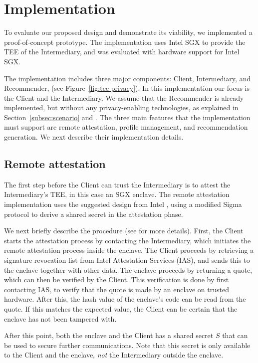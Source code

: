 {\section{Implementation}
\label{sec:recsyssgx:implementation}

To evaluate our proposed design and demonstrate its viability, we implemented a proof-of-concept prototype.
The implementation uses Intel SGX to provide the TEE of the Intermediary, and was evaluated with hardware support for Intel SGX.

The implementation includes three major components: Client, Intermediary, and Recommender, (see Figure~\ref{fig:tee-privacy}).
In this implementation our focus is the Client and the Intermediary.
We assume that the Recommender is already implemented, but without any privacy-enabling technologies, as explained in Section~\ref{subsec:scenario} and \cite{cobleigh:2018}.
The three main features that the implementation must support are remote attestation, profile management, and recommendation generation.
We next describe their implementation details.

\subsection{Remote attestation}
\label{subsec:impl-remoteattestation}
The first step before the Client can trust the Intermediary is to attest the Intermediary's TEE, in this case an SGX enclave.
The remote attestation implementation uses the suggested design from Intel \cite{sgx-ra-example}, using a modified Sigma protocol to derive a shared secret in the attestation phase.

We next briefly describe the procedure (see  \cite{sgx-ra-example} for more details).
First, the Client starts the attestation process by contacting the Intermediary, which initiates the remote attestation process inside the enclave.
The Client proceeds by retrieving a signature revocation list from Intel Attestation Services (IAS), and sends this to the enclave together with other data.
The enclave proceeds by returning a quote, which can then be verified by the Client.
This verification is done by first contacting IAS, to verify that the quote is made by an enclave on trusted hardware.
After this, the hash value of the enclave's code can be read from the quote.
If this matches the expected value, the Client can be certain that the enclave has not been tampered with.

After this point, both the enclave and the Client has a shared secret $S$ that can be used to secure further communications.
Note that this secret is only available to the Client and the enclave, \emph{not} the Intermediary outside the enclave.

}
